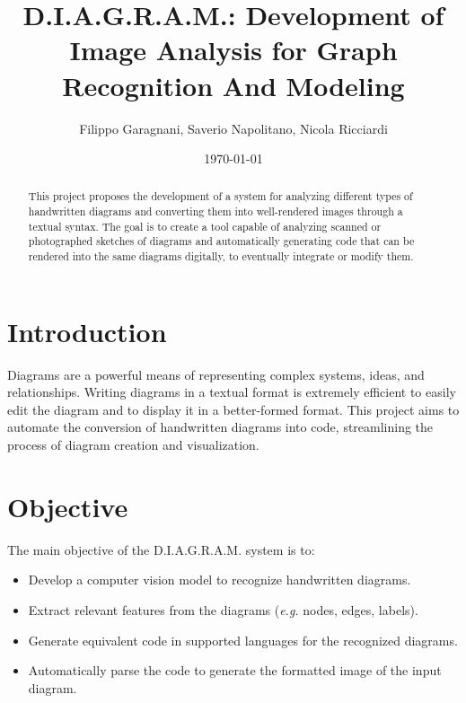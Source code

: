 \documentclass[a4paper,12pt]{article}
\title{D.I.A.G.R.A.M.: Development of Image Analysis for Graph Recognition And Modeling}
\author{Filippo Garagnani, Saverio Napolitano, Nicola Ricciardi}
\date{\today}
\begin{document}
\maketitle

\begin{abstract}
    This project proposes the development of a system for analyzing different types of handwritten diagrams and converting them into well-rendered images through a textual syntax. The goal is to create a tool capable of analyzing scanned or photographed sketches of diagrams and automatically generating code that can be rendered into the same diagrams digitally, to eventually integrate or modify them.
\end{abstract}

\section{Introduction}
    Diagrams are a powerful means of representing complex systems, ideas, and relationships. Writing diagrams in a textual format is extremely efficient to easily edit the diagram and to display it in a better-formed format. This project aims to automate the conversion of handwritten diagrams into code, streamlining the process of diagram creation and visualization.

\section{Objective}
    The main objective of the D.I.A.G.R.A.M. system is to:
    \begin{itemize}
        \item Develop a computer vision model to recognize handwritten diagrams.
        \item Extract relevant features from the diagrams (\textit{e.g.} nodes, edges, labels).
        \item Generate equivalent code in supported languages for the recognized diagrams.
        \item Automatically parse the code to generate the formatted image of the input diagram.
    \end{itemize}
    
\end{document}
